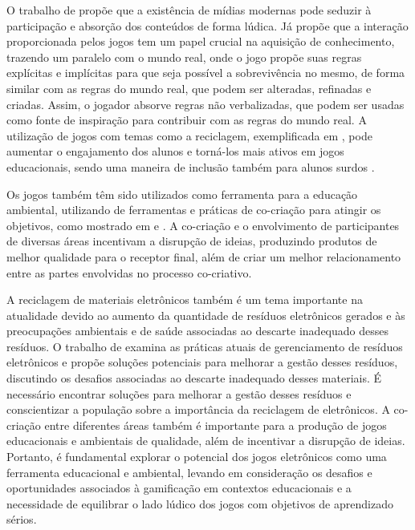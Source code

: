 O trabalho de \cite{savi2008jogos} propõe que a existência de mídias modernas pode seduzir à participação e absorção dos conteúdos de forma lúdica. Já \cite{Vasconcellos_Carvalho_Barreto_Atella_2017} propõe que a interação proporcionada pelos jogos tem um papel crucial na aquisição de conhecimento, trazendo um paralelo com o mundo real, onde o jogo propõe suas regras explícitas e implícitas para que seja possível a sobrevivência no mesmo, de forma similar com as regras do mundo real, que podem ser alteradas, refinadas e criadas. Assim, o jogador absorve regras não verbalizadas, que podem ser usadas como fonte de inspiração para contribuir com as regras do mundo real. A utilização de jogos com temas como a reciclagem, exemplificada em \cite{Raio_2016}, pode aumentar o engajamento dos alunos e torná-los mais ativos em jogos educacionais, sendo uma maneira de inclusão também para alunos surdos \cite{silva2013uso}.

Os jogos também têm sido utilizados como ferramenta para a educação ambiental, utilizando de ferramentas e práticas de co-criação para atingir os objetivos, como mostrado em \cite{rock2018multidisciplinary} e \cite{PRAHALAD20045}. A co-criação e o envolvimento de participantes de diversas áreas incentivam a disrupção de ideias, produzindo produtos de melhor qualidade para o receptor final, além de criar um melhor relacionamento entre as partes envolvidas no processo co-criativo.

A reciclagem de materiais eletrônicos também é um tema importante na atualidade devido ao aumento da quantidade de resíduos eletrônicos gerados e às preocupações ambientais e de saúde associadas ao descarte inadequado desses resíduos. O trabalho de \cite{eWasteContamination} examina as práticas atuais de gerenciamento de resíduos eletrônicos e propõe soluções potenciais para melhorar a gestão desses resíduos, discutindo os desafios associadas ao descarte inadequado desses materiais. É necessário encontrar soluções para melhorar a gestão desses resíduos e conscientizar a população sobre a importância da reciclagem de eletrônicos. A co-criação entre diferentes áreas também é importante para a produção de jogos educacionais e ambientais de qualidade, além de incentivar a disrupção de ideias. Portanto, é fundamental explorar o potencial dos jogos eletrônicos como uma ferramenta educacional e ambiental, levando em consideração os desafios e oportunidades associados à gamificação em contextos educacionais e a necessidade de equilibrar o lado lúdico dos jogos com objetivos de aprendizado sérios.

